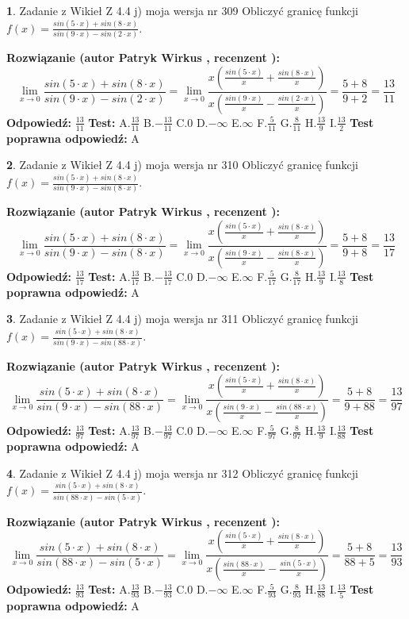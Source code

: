 \documentclass[12pt, a4paper]{article}
\theoremstyle{definition} %
\newtheorem{zad}{}
\newcommand{\zadStart}[1]{\begin{zad}#1\newline}
\newcommand{\zadStop}{\end{zad}}
\newcommand{\rozwStart}[2]{\noindent \textbf{Rozwiązanie (autor #1 , recenzent #2): }\newline}
\newcommand{\rozwStop}{\newline}
\newcommand{\odpStart}{\noindent \textbf{Odpowiedź:}\newline}
\newcommand{\odpStop}{\newline}
\newcommand{\testStart}{\noindent \textbf{Test:}\newline}
\newcommand{\testStop}{\newline}
\newcommand{\kluczStart}{\noindent \textbf{Test poprawna odpowiedź:}\newline}
\newcommand{\kluczStop}{\newline}
\begin{document}
\zadStart{Zadanie z Wikieł Z 4.4 j) moja wersja nr 309}
Obliczyć granicę funkcji $f(x)=\frac{sin(5\cdot x) +sin(8\cdot x)}{sin(9\cdot x) -sin(2\cdot x)}$.
\zadStop
\rozwStart{Patryk Wirkus}{}
$$\lim\limits_{x\to 0}\frac{sin(5\cdot x) +sin(8\cdot x)}{sin(9\cdot x) -sin(2\cdot x)}=\lim\limits_{x\to 0}\frac{x(\frac{sin(5\cdot x)}{x}+\frac{sin(8\cdot x)}{x})}{x(\frac{sin(9\cdot x)}{x}-\frac{sin(2\cdot x)}{x})}=\frac{5+8}{9+2} = \frac{13}{11}$$
\rozwStop
\odpStart
$\frac{13}{11}$
\odpStop
\testStart
A.$\frac{13}{11}$
B.$-\frac{13}{11}$
C.$0$
D.$-\infty$
E.$\infty$
F.$\frac{5}{11}$
G.$\frac{8}{11}$
H.$\frac{13}{9}$
I.$\frac{13}{2}$
\testStop
\kluczStart
A
\kluczStop



\zadStart{Zadanie z Wikieł Z 4.4 j) moja wersja nr 310}
Obliczyć granicę funkcji $f(x)=\frac{sin(5\cdot x) +sin(8\cdot x)}{sin(9\cdot x) -sin(8\cdot x)}$.
\zadStop
\rozwStart{Patryk Wirkus}{}
$$\lim\limits_{x\to 0}\frac{sin(5\cdot x) +sin(8\cdot x)}{sin(9\cdot x) -sin(8\cdot x)}=\lim\limits_{x\to 0}\frac{x(\frac{sin(5\cdot x)}{x}+\frac{sin(8\cdot x)}{x})}{x(\frac{sin(9\cdot x)}{x}-\frac{sin(8\cdot x)}{x})}=\frac{5+8}{9+8} = \frac{13}{17}$$
\rozwStop
\odpStart
$\frac{13}{17}$
\odpStop
\testStart
A.$\frac{13}{17}$
B.$-\frac{13}{17}$
C.$0$
D.$-\infty$
E.$\infty$
F.$\frac{5}{17}$
G.$\frac{8}{17}$
H.$\frac{13}{9}$
I.$\frac{13}{8}$
\testStop
\kluczStart
A
\kluczStop



\zadStart{Zadanie z Wikieł Z 4.4 j) moja wersja nr 311}
Obliczyć granicę funkcji $f(x)=\frac{sin(5\cdot x) +sin(8\cdot x)}{sin(9\cdot x) -sin(88\cdot x)}$.
\zadStop
\rozwStart{Patryk Wirkus}{}
$$\lim\limits_{x\to 0}\frac{sin(5\cdot x) +sin(8\cdot x)}{sin(9\cdot x) -sin(88\cdot x)}=\lim\limits_{x\to 0}\frac{x(\frac{sin(5\cdot x)}{x}+\frac{sin(8\cdot x)}{x})}{x(\frac{sin(9\cdot x)}{x}-\frac{sin(88\cdot x)}{x})}=\frac{5+8}{9+88} = \frac{13}{97}$$
\rozwStop
\odpStart
$\frac{13}{97}$
\odpStop
\testStart
A.$\frac{13}{97}$
B.$-\frac{13}{97}$
C.$0$
D.$-\infty$
E.$\infty$
F.$\frac{5}{97}$
G.$\frac{8}{97}$
H.$\frac{13}{9}$
I.$\frac{13}{88}$
\testStop
\kluczStart
A
\kluczStop



\zadStart{Zadanie z Wikieł Z 4.4 j) moja wersja nr 312}
Obliczyć granicę funkcji $f(x)=\frac{sin(5\cdot x) +sin(8\cdot x)}{sin(88\cdot x) -sin(5\cdot x)}$.
\zadStop
\rozwStart{Patryk Wirkus}{}
$$\lim\limits_{x\to 0}\frac{sin(5\cdot x) +sin(8\cdot x)}{sin(88\cdot x) -sin(5\cdot x)}=\lim\limits_{x\to 0}\frac{x(\frac{sin(5\cdot x)}{x}+\frac{sin(8\cdot x)}{x})}{x(\frac{sin(88\cdot x)}{x}-\frac{sin(5\cdot x)}{x})}=\frac{5+8}{88+5} = \frac{13}{93}$$
\rozwStop
\odpStart
$\frac{13}{93}$
\odpStop
\testStart
A.$\frac{13}{93}$
B.$-\frac{13}{93}$
C.$0$
D.$-\infty$
E.$\infty$
F.$\frac{5}{93}$
G.$\frac{8}{93}$
H.$\frac{13}{88}$
I.$\frac{13}{5}$
\testStop
\kluczStart
A
\kluczStop
\end{document}
